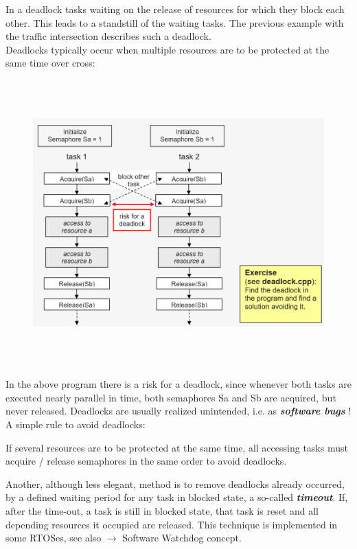 In a deadlock tasks waiting on the release of resources for which they block each other. This leads to a standstill of the waiting tasks. The previous example with the traffic intersection describes such a deadlock.\\

Deadlocks typically occur when multiple resources are to be protected at the same time over cross:

 	\begin{figure}[h]
    \centering
    \includegraphics[width=12cm, height=11cm]{Images/image108.png}
    \label{fig:Fig }
    \end{figure}

In the above program there is a risk for a deadlock, since whenever both tasks are executed nearly parallel in time, both semaphores Sa and Sb are acquired, but never released. Deadlocks are usually realized unintended, i.e. as \textbf{\textit{software bugs}} !\\

A simple rule to avoid deadlocks:

\begin{tcolorbox}[colback=blue!5!white,colframe=blue!75!black]
	If several resources are to be protected at the same time, all accessing tasks must acquire / release semaphores in the same order to avoid deadlocks.
\end{tcolorbox}

Another, although less elegant, method is to remove deadlocks already occurred, by a defined waiting period for any task in blocked state, a so-called \textbf{\textit{timeout}}. If, after the time-out, a task is still in blocked state, that task is reset and all depending resources it occupied are released. This technique is implemented in some RTOSes, see also $\rightarrow$ Software Watchdog concept.\\

